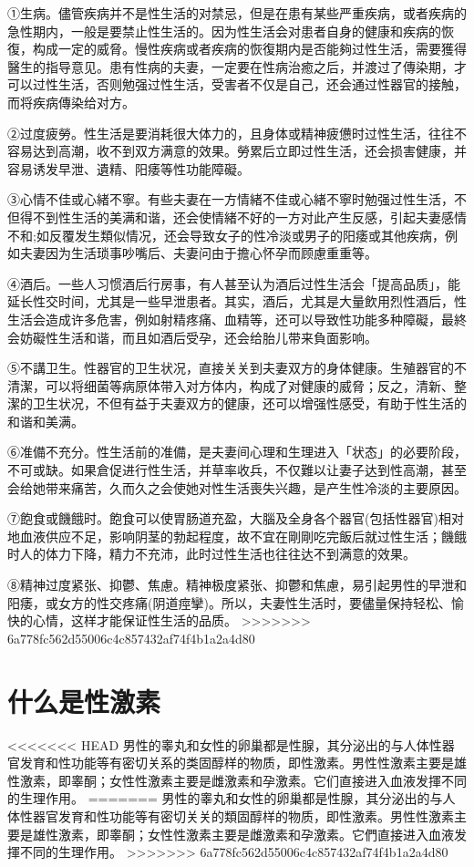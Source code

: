 \documentclass[12pt,UTF8]{ctexbook}
\begin{document}
①生病。儘管疾病并不是性生活的对禁忌，但是在患有某些严重疾病，或者疾病的急性期内，一般是要禁止性生活的。因为性生活会对患者自身的健康和疾病的恢復，构成一定的威脅。慢性疾病或者疾病的恢復期内是否能夠过性生活，需要獲得醫生的指导意见。患有性病的夫妻，一定要在性病治癒之后，并渡过了傳染期，才可以过性生活，否则勉强过性生活，受害者不仅是自己，还会通过性器官的接触，而将疾病傳染给对方。

②过度疲勞。性生活是要消耗很大体力的，且身体或精神疲憊时过性生活，往往不容易达到高潮，收不到双方满意的效果。勞累后立即过性生活，还会损害健康，并容易诱发早泄、遺精、阳痿等性功能障礙。

③心情不佳或心緒不寧。有些夫妻在一方情緒不佳或心緒不寧时勉强过性生活，不但得不到性生活的美满和谐，还会使情緒不好的一方对此产生反感，引起夫妻感情不和;如反覆发生類似情况，还会导致女子的性冷淡或男子的阳痿或其他疾病，例如夫妻因为生活琐事吵嘴后、夫妻问由于擔心怀孕而顾慮重重等。

④酒后。一些人习惯酒后行房事，有人甚至认为酒后过性生活会「提高品质」，能延长性交时间，尤其是一些早泄患者。其实，酒后，尤其是大量飲用烈性酒后，性生活会造成许多危害，例如射精疼痛、血精等，还可以导致性功能多种障礙，最終会妨礙性生活和谐，而且如酒后受孕，还会给胎儿带来負面影响。

⑤不講卫生。性器官的卫生状况，直接关关到夫妻双方的身体健康。生殖器官的不清潔，可以将细菌等病原体带入对方体内，构成了对健康的威脅；反之，清新、整潔的卫生状况，不但有益于夫妻双方的健康，还可以增强性感受，有助于性生活的和谐和美满。

⑥准備不充分。性生活前的准備，是夫妻间心理和生理进入「状态」的必要阶段，不可或缺。如果倉促进行性生活，并草率收兵，不仅難以让妻子达到性高潮，甚至会给她带来痛苦，久而久之会使她对性生活喪失兴趣，是产生性冷淡的主要原因。

⑦飽食或饑餓时。飽食可以使胃肠道充盈，大腦及全身各个器官(包括性器官)相对地血液供应不足，影响阴茎的勃起程度，故不宜在剛剛吃完飯后就过性生活；饑餓时人的体力下降，精力不充沛，此时过性生活也往往达不到满意的效果。

⑧精神过度紧张、抑鬱、焦慮。精神极度紧张、抑鬱和焦慮，易引起男性的早泄和阳痿，或女方的性交疼痛(阴道痙攣)。所以，夫妻性生活时，要儘量保持轻松、愉快的心情，这样才能保证性生活的品质。
>>>>>>> 6a778fc562d55006c4c857432af74f4b1a2a4d80

\section{什么是性激素}

<<<<<<< HEAD
男性的睾丸和女性的卵巢都是性腺，其分泌出的与人体性器官发育和性功能等有密切关系的类固醇样的物质，即性激素。男性性激素主要是雄性激素，即睾酮；女性性激素主要是雌激素和孕激素。它们直接进入血液发揮不同的生理作用。
=======
男性的睾丸和女性的卵巢都是性腺，其分泌出的与人体性器官发育和性功能等有密切关关的類固醇样的物质，即性激素。男性性激素主要是雄性激素，即睾酮；女性性激素主要是雌激素和孕激素。它們直接进入血液发揮不同的生理作用。
>>>>>>> 6a778fc562d55006c4c857432af74f4b1a2a4d80
\end{document}

